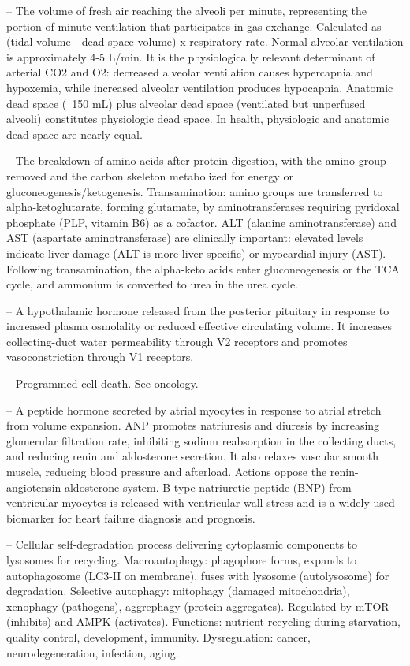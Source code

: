 -- The volume of fresh air reaching the alveoli per minute, representing the portion of minute ventilation that participates in gas exchange. Calculated as (tidal volume - dead space volume) x respiratory rate. Normal alveolar ventilation is approximately 4-5 L/min. It is the physiologically relevant determinant of arterial CO2 and O2: decreased alveolar ventilation causes hypercapnia and hypoxemia, while increased alveolar ventilation produces hypocapnia. Anatomic dead space (~150 mL) plus alveolar dead space (ventilated but unperfused alveoli) constitutes physiologic dead space. In health, physiologic and anatomic dead space are nearly equal.

-- The breakdown of amino acids after protein digestion, with the amino group removed and the carbon skeleton metabolized for energy or gluconeogenesis/ketogenesis. Transamination: amino groups are transferred to alpha-ketoglutarate, forming glutamate, by aminotransferases requiring pyridoxal phosphate (PLP, vitamin B6) as a cofactor. ALT (alanine aminotransferase) and AST (aspartate aminotransferase) are clinically important: elevated levels indicate liver damage (ALT is more liver-specific) or myocardial injury (AST). Following transamination, the alpha-keto acids enter gluconeogenesis or the TCA cycle, and ammonium is converted to urea in the urea cycle.

-- A hypothalamic hormone released from the posterior pituitary in response to increased plasma osmolality or reduced effective circulating volume. It increases collecting-duct water permeability through V2 receptors and promotes vasoconstriction through V1 receptors.

-- Programmed cell death. See oncology.

-- A peptide hormone secreted by atrial myocytes in response to atrial stretch from volume expansion. ANP promotes natriuresis and diuresis by increasing glomerular filtration rate, inhibiting sodium reabsorption in the collecting ducts, and reducing renin and aldosterone secretion. It also relaxes vascular smooth muscle, reducing blood pressure and afterload. Actions oppose the renin-angiotensin-aldosterone system. B-type natriuretic peptide (BNP) from ventricular myocytes is released with ventricular wall stress and is a widely used biomarker for heart failure diagnosis and prognosis.

-- Cellular self-degradation process delivering cytoplasmic components to lysosomes for recycling. Macroautophagy: phagophore forms, expands to autophagosome (LC3-II on membrane), fuses with lysosome (autolysosome) for degradation. Selective autophagy: mitophagy (damaged mitochondria), xenophagy (pathogens), aggrephagy (protein aggregates). Regulated by mTOR (inhibits) and AMPK (activates). Functions: nutrient recycling during starvation, quality control, development, immunity. Dysregulation: cancer, neurodegeneration, infection, aging.

